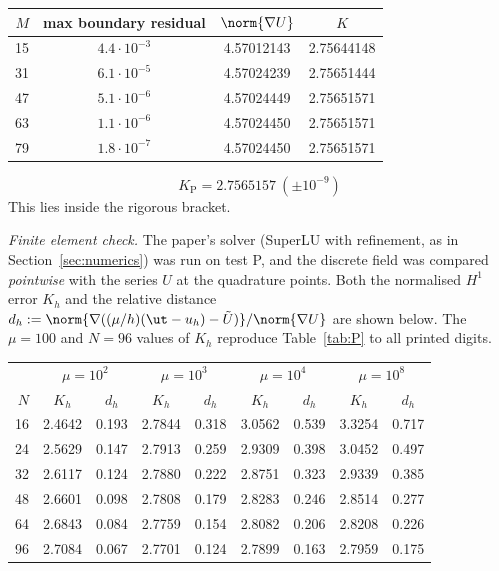 \begin{center}
\begin{tabular}{rccc}
\toprule
$M$ & max boundary residual & $\norm{\nabla U}$ & $K$\\
\midrule
15 & $4.4\cdot10^{-3}$ & 4.57012143 & 2.75644148\\
31 & $6.1\cdot10^{-5}$ & 4.57024239 & 2.75651444\\
47 & $5.1\cdot10^{-6}$ & 4.57024449 & 2.75651571\\
63 & $1.1\cdot10^{-6}$ & 4.57024450 & 2.75651571\\
79 & $1.8\cdot10^{-7}$ & 4.57024450 & 2.75651571\\
\bottomrule
\end{tabular}
\end{center}

\[
\boxed{\,K_{\mathrm P}=2.7565157\ (\pm10^{-9})\,}
\]
This lies inside the rigorous bracket.

\emph{Finite element check.} The paper's solver (SuperLU with refinement, as in Section~\ref{sec:numerics}) was run on test P, and
the discrete field was compared \emph{pointwise} with the series $U$ at the quadrature points. Both the normalised $H^1$ error
$K_h$ and the relative distance $d_h:=\norm{\nabla((\mu/h)(\ut-u_h)-\tilde U)}/\norm{\nabla U}$ are shown below. The $\mu=100$ and
$N=96$ values of $K_h$ reproduce Table~\ref{tab:P} to all printed digits.

\begin{center}\small
\begin{tabular}{r|cc|cc|cc|cc}
\toprule
 & \multicolumn{2}{c|}{$\mu=10^2$} & \multicolumn{2}{c|}{$\mu=10^3$} & \multicolumn{2}{c|}{$\mu=10^4$} & \multicolumn{2}{c}{$\mu=10^8$}\\
$N$ & $K_h$ & $d_h$ & $K_h$ & $d_h$ & $K_h$ & $d_h$ & $K_h$ & $d_h$\\
\midrule
16 & 2.4642 & 0.193 & 2.7844 & 0.318 & 3.0562 & 0.539 & 3.3254 & 0.717\\
24 & 2.5629 & 0.147 & 2.7913 & 0.259 & 2.9309 & 0.398 & 3.0452 & 0.497\\
32 & 2.6117 & 0.124 & 2.7880 & 0.222 & 2.8751 & 0.323 & 2.9339 & 0.385\\
48 & 2.6601 & 0.098 & 2.7808 & 0.179 & 2.8283 & 0.246 & 2.8514 & 0.277\\
64 & 2.6843 & 0.084 & 2.7759 & 0.154 & 2.8082 & 0.206 & 2.8208 & 0.226\\
96 & 2.7084 & 0.067 & 2.7701 & 0.124 & 2.7899 & 0.163 & 2.7959 & 0.175\\
\bottomrule
\end{tabular}
\end{center}

